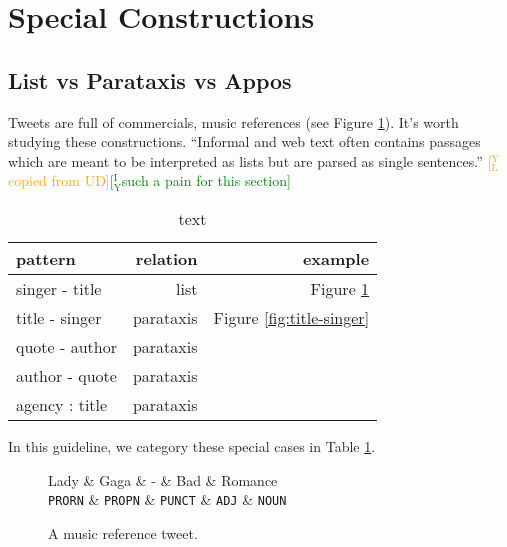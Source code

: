 \documentclass[11pt,a4paper]{article}
\newcommand{\yjcomment}[1]{\textcolor{orange}{[$_\mathrm{L}^\mathrm{Y}$#1]}}
\newcommand{\yicomment}[1]{\textcolor{green}{[$_\mathrm{Y}^\mathrm{I}$#1]}}
\begin{document}
\section{Special Constructions}

\subsection{List vs Parataxis vs Appos}

Tweets are full of commercials, music references (see Figure \ref{fig:singer-title}).
It's worth studying these constructions.
``Informal and web text often contains passages which are meant to be
interpreted as lists but are parsed as single sentences.'' \yjcomment{copied from UD}\yicomment{such a pain for this section}

\begin{table}[t]
	\centering
	\begin{tabular}{lrr}
		\hline
		pattern & relation & example \\
		\hline
		singer - title & list & Figure \ref{fig:singer-title} \\
		title - singer & parataxis & Figure \ref{fig:title-singer} \\
		quote - author & parataxis & \\
		author - quote & parataxis & \\
		agency : title & parataxis & \\
		\hline
	\end{tabular}
\caption{text}\label{tbl:list-construct}
\end{table}

In this guideline, we category these special cases in Table \ref{tbl:list-construct}.

\begin{figure}[t]
	\centering
	\small
	\begin{dependency}[edge slant=2, text only label, label style=above]
		\begin{deptext}
			Lady  \& Gaga \& - \& Bad \& Romance \\
			\texttt{PRORN} \& \texttt{PROPN} \& \texttt{PUNCT} \& \texttt{ADJ} \& \texttt{NOUN} \\
		\end{deptext}
	\end{dependency}
	\caption{A music reference tweet.}\label{fig:singer-title}
\end{figure}
\end{document}
